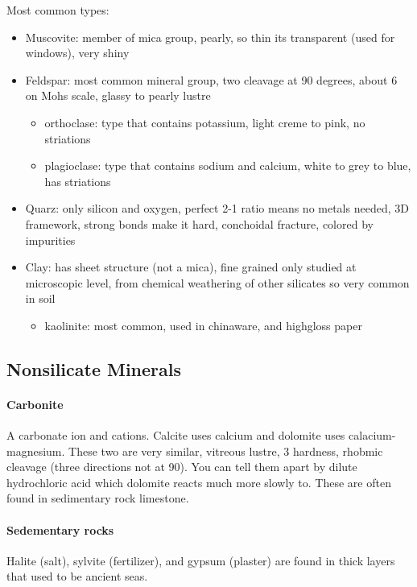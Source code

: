 \documentclass{article}
\begin{document}
Most common types:
\begin{itemize}
    \item Muscovite: member of mica group, pearly, so thin its transparent (used for windows), very shiny
    \item Feldspar: most common mineral group, two cleavage at 90 degrees, about 6 on Mohs scale, glassy to pearly lustre
    \begin{itemize}
        \item orthoclase: type that contains potassium, light creme to pink, no striations
        \item plagioclase: type that contains sodium and calcium, white to grey to blue, has striations
    \end{itemize}
    \item Quarz: only silicon and oxygen, perfect 2-1 ratio means no metals needed, 3D framework, strong bonds make it hard, conchoidal fracture, colored by impurities
    \item Clay: has sheet structure (not a mica), fine grained only studied at microscopic level, from chemical weathering of other silicates so very common in soil
    \begin{itemize}
        \item kaolinite: most common, used in chinaware, and highgloss paper
    \end{itemize}
\end{itemize}


\subsection{Nonsilicate Minerals} %
\label{sub:nonsilicate_minerals}
\paragraph{Carbonite} %
\label{par:carbonite}
A carbonate ion and cations. Calcite uses calcium and dolomite uses calacium-magnesium. These two are very similar, vitreous lustre, 3 hardness, rhobmic cleavage (three directions not at 90). You can tell them apart by dilute hydrochloric acid which dolomite reacts much more slowly to. These are often found in sedimentary rock limestone.

\paragraph{Sedementary rocks} %
\label{par:sedementary_rocks}
Halite (salt), sylvite (fertilizer), and gypsum (plaster) are found in thick layers that used to be ancient seas.
\end{document}
